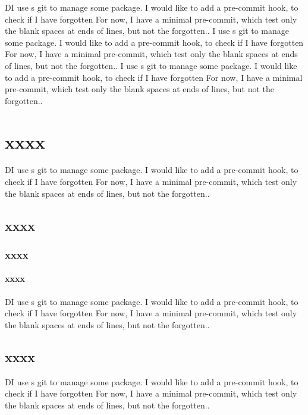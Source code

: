 \documentclass[a4paper, oneside, 12pt]{book}
\begin{document}
\tableofcontents
\newpage

\beginnumbering

\pstart
{}
\pend
\pstart
DI use s git to manage some package.
I would like to add a pre-commit hook, to check if I have forgotten
For now, I have a minimal pre-commit, which test only the blank spaces at ends of lines, but not the forgotten..
\pend
\pstart
{}
\pend
\pstart
{}
\pend
\pstart
{}
\pend
\pstart
{}I use s git to manage some package.
I would like to add a pre-commit hook, to check if I have forgotten
For now, I have a minimal pre-commit, which test only the blank spaces at ends of lines, but not the forgotten..
\pend
\pstart
{}
\pend
\pstart
{}I use s git to manage some package.
I would like to add a pre-commit hook, to check if I have forgotten
For now, I have a minimal pre-commit, which test only the blank spaces at ends of lines, but not the forgotten..
\pend


\endnumbering
\newpage

\chapter{xxxx}
DI use s git to manage some package.
I would like to add a pre-commit hook, to check if I have forgotten
For now, I have a minimal pre-commit, which test only the blank spaces at ends of lines, but not the forgotten..
\section{xxxx}
\subsection{xxxx}
\subsubsection{xxxx}
DI use s git to manage some package.
I would like to add a pre-commit hook, to check if I have forgotten
For now, I have a minimal pre-commit, which test only the blank spaces at ends of lines, but not the forgotten..
\section{xxxx}

DI use s git to manage some package.
I would like to add a pre-commit hook, to check if I have forgotten
For now, I have a minimal pre-commit, which test only the blank spaces at ends of lines, but not the forgotten..
\end{document}
